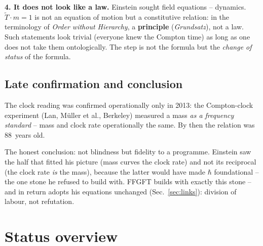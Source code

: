 \textbf{4. It does not look like a law.} Einstein sought field
equations -- dynamics. $\tilde T \cdot m = 1$ is not an equation of
motion but a constitutive relation: in the terminology of
\emph{Order without Hierarchy}, a \textbf{principle}
(\emph{Grundsatz}), not a law. Such statements look trivial
(everyone knew the Compton time) as long as one does not take them
ontologically. The step is not the formula but the \emph{change of
status} of the formula.

\section{Late confirmation and conclusion}

The clock reading was confirmed operationally only in 2013: the
Compton-clock experiment (Lan, Müller et al., Berkeley) measured a
mass \emph{as a frequency standard} -- mass and clock rate
operationally the same. By then the relation was 88~years old.

The honest conclusion: not blindness but fidelity to a programme.
Einstein saw the half that fitted his picture (mass curves the
clock rate) and not its reciprocal (the clock rate \emph{is} the
mass), because the latter would have made $\hbar$ foundational --
the one stone he refused to build with. FFGFT builds with exactly
this stone -- and in return adopts his equations unchanged
(Sec.~\ref{sec:links}): division of labour, not refutation.

\chapter{Status overview}

